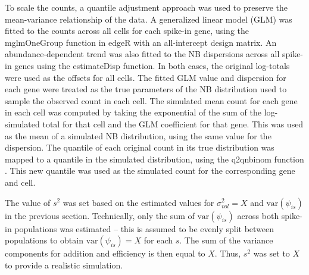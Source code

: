 \documentclass{article}
\begin{document}
To scale the counts, a quantile adjustment approach was used to preserve the mean-variance relationship of the data.
A generalized linear model (GLM) was fitted to the counts across all cells for each spike-in gene, using the mglmOneGroup function in edgeR \cite{mccarthy2012differential, robinson2010edgeR} with an all-intercept design matrix.
An abundance-dependent trend was also fitted to the NB dispersions across all spike-in genes using the estimateDisp function.
In both cases, the original log-totals were used as the offsets for all cells.
The fitted GLM value and dispersion for each gene were treated as the true parameters of the NB distribution used to sample the observed count in each cell.
The simulated mean count for each gene in each cell was computed by taking the exponential of the sum of the log-simulated total for that cell and the GLM coefficient for that gene.
This was used as the mean of a simulated NB distribution, using the same value for the dispersion.
The quantile of each original count in its true distribution was mapped to a quantile in the simulated distribution, using the q2qnbinom function \cite{robinson2008small}.
This new quantile was used as the simulated count for the corresponding gene and cell.



The value of $s^2$ was set based on the estimated values for $\sigma^2_{vol} = X$ and $\mbox{var}(\psi_{is})$ in the previous section.
Technically, only the sum of $\mbox{var}(\psi_{is})$ across both spike-in populations was estimated 
    -- this is assumed to be evenly split between populations to obtain $\mbox{var}(\psi_{is}) = X$ for each $s$.
The sum of the variance components for addition and efficiency is then equal to $X$.
Thus, $s^2$ was set to $X$ to provide a realistic simulation.
\end{document}
